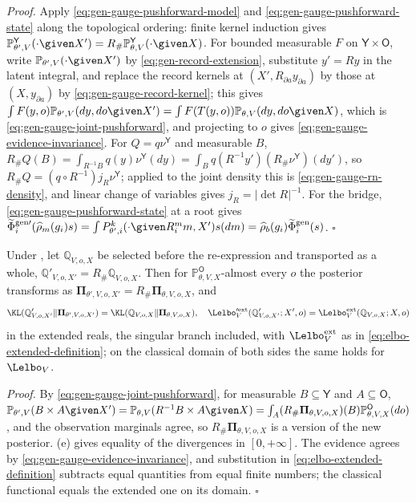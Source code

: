 \noindent\emph{Proof.}
Apply \eqref{eq:gen-gauge-pushforward-model} and \eqref{eq:gen-gauge-pushforward-state} along the
topological ordering: finite kernel induction gives
$\mathbb P_{\theta',V}^{\mathsf Y}(\cdot\given X')=R_\#\mathbb P_{\theta,V}^{\mathsf Y}(\cdot\given X)$. For bounded
measurable $F$ on $\mathsf Y\times\mathsf O$, write $\mathbb P_{\theta',V}(\cdot\given X')$ by
\eqref{eq:gen-record-extension}, substitute $y'=Ry$ in the latent integral, and replace the record kernels
at $(X',R_{\partial a}y_{\partial a})$ by those at $(X,y_{\partial a})$ by \eqref{eq:gen-gauge-record-kernel};
this gives $\int F(y,o)\mathbb P_{\theta',V}(dy,do\given X')=\int F(T(y,o))\mathbb P_{\theta,V}(dy,do\given X)$,
which is \eqref{eq:gen-gauge-joint-pushforward}, and projecting to $o$ gives
\eqref{eq:gen-gauge-evidence-invariance}.
For $Q=q\nu^{\mathsf Y}$ and measurable $B$,
$R_\#Q(B)=\int_{R^{-1}B}q(y)\nu^{\mathsf Y}(dy)=\int_Bq(R^{-1}y')(R_\#\nu^{\mathsf Y})(dy')$, so
$R_\#Q=(q\circ R^{-1})j_R\nu^{\mathsf Y}$; applied to the joint density this is
\eqref{eq:gen-gauge-rn-density}, and linear change of variables gives $j_R=\lvert\det R\rvert^{-1}$. For the
bridge, \eqref{eq:gen-gauge-pushforward-state} at a root gives
$\widetilde\Phi^{\mathrm{gen}\prime}_i(\widehat\rho_m(g_i)s)=\int P_{\theta',i}^{k}(\cdot\given R_i^mm,X')s(dm)
=\widehat\rho_b(g_i)\widetilde\Phi^{\mathrm{gen}}_i(s)$. \hfill$\square$

Under , let $\mathbb Q_{V,o,X}$ be selected before the re-expression and
transported as a whole, $\mathbb Q'_{V,o,X'}=R_\#\mathbb Q_{V,o,X}$. Then for $\mathbb P_{\theta,V,X}^{\mathsf O}$-almost
every $o$ the posterior transforms as $\boldsymbol\Pi_{\theta',V,o,X'}=R_\#\boldsymbol\Pi_{\theta,V,o,X}$, and
\begin{equation}
\KL(\mathbb Q'_{V,o,X'}\Vert\boldsymbol\Pi_{\theta',V,o,X'})
=\KL(\mathbb Q_{V,o,X}\Vert\boldsymbol\Pi_{\theta,V,o,X}),
\quad
\Lelbo'^{\mathrm{ext}}_V(\mathbb Q'_{V,o,X'};X',o)=\Lelbo^{\mathrm{ext}}_V(\mathbb Q_{V,o,X};X,o)
\label{eq:elbo-gauge-invariance}
\end{equation}
in the extended reals, the singular branch included, with $\Lelbo^{\mathrm{ext}}_V$ as in
\eqref{eq:elbo-extended-definition}; on the classical domain of both sides the same holds for $\Lelbo_V$.

\noindent\emph{Proof.}
By \eqref{eq:gen-gauge-joint-pushforward}, for measurable $B\subseteq\mathsf Y$ and $A\subseteq\mathsf O$,
$\mathbb P_{\theta',V}(B\times A\given X')=\mathbb P_{\theta,V}(R^{-1}B\times A\given X)
=\int_A(R_\#\boldsymbol\Pi_{\theta,V,o,X})(B)\mathbb P^{\mathsf O}_{\theta,V,X}(do)$, and the observation marginals
agree, so $R_\#\boldsymbol\Pi_{\theta,V,o,X}$ is a version of the new posterior. (e)
gives equality of the divergences in $[0,+\infty]$. The evidence agrees by
\eqref{eq:gen-gauge-evidence-invariance}, and substitution in \eqref{eq:elbo-extended-definition} subtracts
equal quantities from equal finite numbers; the classical functional equals the extended one on its domain.
\hfill$\square$

